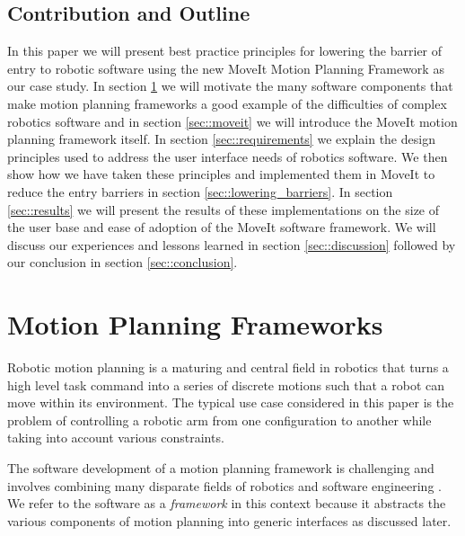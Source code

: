 \documentclass[10pt,journal,compsoc]{joser1}
\begin{document}
{%
\subsection{Contribution and Outline}

In this paper we will present best practice principles for lowering the barrier of entry to robotic software using the new MoveIt Motion Planning Framework as our case study. In section \ref{sec::motion_planning} we will motivate the many software components that make motion planning frameworks a good example of the difficulties of complex robotics software and in section \ref{sec::moveit} we will introduce the MoveIt motion planning framework itself. In section \ref{sec::requirements} we explain the design principles used to address the user interface needs of robotics software. We then show how we have taken these principles and implemented them in MoveIt to reduce the entry barriers in section \ref{sec::lowering_barriers}. In section \ref{sec::results} we will present the results of these implementations on the size of the user base and ease of adoption of the MoveIt software framework. We will discuss our experiences and lessons learned in section \ref{sec::discussion} followed by our conclusion in section \ref{sec::conclusion}.

\section{Motion Planning Frameworks}
\label{sec::motion_planning}

Robotic motion planning is a maturing and central field in robotics \cite{moll2011teaching} that turns a high level task command into a series of discrete motions such that a robot can move within its environment. The typical use case considered in this paper is the problem of controlling a robotic arm from one configuration to another while taking into account various constraints.

The software development of a motion planning framework is challenging and involves combining many disparate fields of robotics and software engineering \cite{perez2010roadmap}. We refer to the software as a \textit{framework} in this context because it abstracts the various components of motion planning into generic interfaces as discussed later.

}
\end{document}
